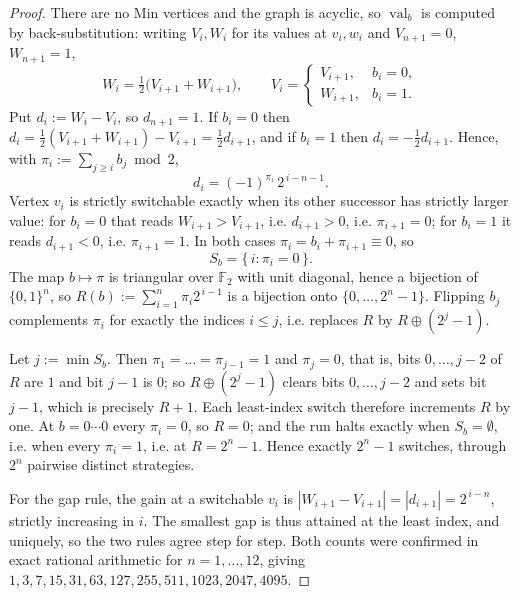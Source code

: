 \documentclass[11pt]{article}
\theoremstyle{plain}
\theoremstyle{definition}
\DeclareMathOperator{\val}{val}
\begin{document}
\begin{proof}
There are no Min vertices and the graph is acyclic, so $\val_b$ is
computed by back-substitution: writing $V_i,W_i$ for its values at
$v_i,w_i$ and $V_{n+1}=0$, $W_{n+1}=1$,
\[
  W_i=\tfrac12\bigl(V_{i+1}+W_{i+1}\bigr),\qquad
  V_i=\begin{cases}V_{i+1},&b_i=0,\\ W_{i+1},&b_i=1.\end{cases}
\]
Put $d_i:=W_i-V_i$, so $d_{n+1}=1$. If $b_i=0$ then
$d_i=\tfrac12(V_{i+1}+W_{i+1})-V_{i+1}=\tfrac12 d_{i+1}$, and if $b_i=1$
then $d_i=-\tfrac12 d_{i+1}$. Hence, with
$\pi_i:=\sum_{j\ge i}b_j \bmod 2$,
\[
  d_i=(-1)^{\pi_i}\,2^{\,i-n-1}.
\]
Vertex $v_i$ is strictly switchable exactly when its other successor has
strictly larger value: for $b_i=0$ that reads $W_{i+1}>V_{i+1}$, i.e.
$d_{i+1}>0$, i.e. $\pi_{i+1}=0$; for $b_i=1$ it reads $d_{i+1}<0$, i.e.
$\pi_{i+1}=1$. In both cases $\pi_i=b_i+\pi_{i+1}\equiv0$, so
\[
  S_b=\{\,i:\pi_i=0\,\}.
\]
The map $b\mapsto\pi$ is triangular over $\mathbb{F}_2$ with unit
diagonal, hence a bijection of $\{0,1\}^n$, so
$R(b):=\sum_{i=1}^{n}\pi_i2^{\,i-1}$ is a bijection onto
$\{0,\dots,2^n-1\}$. Flipping $b_j$ complements $\pi_i$ for exactly the
indices $i\le j$, i.e. replaces $R$ by $R\oplus(2^{j}-1)$.

Let $j:=\min S_b$. Then $\pi_1=\dots=\pi_{j-1}=1$ and $\pi_j=0$, that is,
bits $0,\dots,j-2$ of $R$ are $1$ and bit $j-1$ is $0$; so
$R\oplus(2^{j}-1)$ clears bits $0,\dots,j-2$ and sets bit $j-1$, which is
precisely $R+1$. Each least-index switch therefore increments $R$ by one.
At $b=0\cdots0$ every $\pi_i=0$, so $R=0$; and the run halts exactly when
$S_b=\emptyset$, i.e. when every $\pi_i=1$, i.e. at $R=2^n-1$. Hence
exactly $2^n-1$ switches, through $2^n$ pairwise distinct strategies.

For the gap rule, the gain at a switchable $v_i$ is
$|W_{i+1}-V_{i+1}|=|d_{i+1}|=2^{\,i-n}$, strictly increasing in $i$. The
smallest gap is thus attained at the least index, and uniquely, so the
two rules agree step for step. Both counts were confirmed in exact
rational arithmetic for $n=1,\dots,12$, giving
$1,3,7,15,31,63,127,255,511,1023,2047,4095$.
\end{proof}
\end{document}
